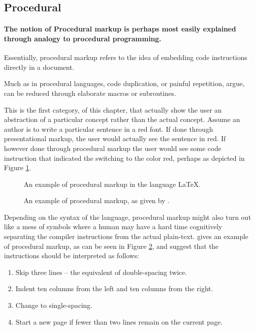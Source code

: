 \documentclass{scrreprt}
\begin{document}
\subsection{Procedural}
\paragraph{The notion of Procedural markup is perhaps most easily explained through analogy to procedural programming.} Essentially, procedural markup refers to the idea of embedding code instructions directly in a document.

Much as in procedural languages, code duplication, or painful repetition, \citet{bray} argue, can be reduced through elaborate macros or subroutines.

This is the first category, of this chapter, that actually show the user an abstraction of a particular concept rather than the actual concept. Assume an author is to write a particular sentence in a red font. If done through presentational markup, the user would actually see the sentence in red. If however done through procedural markup the user would see some code instruction that indicated the switching to the color red, perhaps as depicted in Figure \ref{fig:procedural-markup-red-sentence}.


\begin{figure}[h]
\centering
{}
\caption{An example of procedural markup in the language \LaTeX{}.}
\label{fig:procedural-markup-red-sentence}
\end{figure}


\begin{figure}[h]
\centering
{}
\caption{An example of procedural markup, as given by \citet{coombs}.}
\label{fig:procedural-markup-coombs}
\end{figure}



Depending on the syntax of the language, procedural markup might also turn out like a mess of symbols where a human may have a hard time cognitively separating the compiler instructions from the actual plain-text. \citet{coombs} gives an example of procedural markup, as can be seen in Figure \ref{fig:procedural-markup-coombs}, and suggest that the instructions should be interpreted as follows:

\begin{enumerate}
\item Skip three lines -- the equivalent of double-spacing twice.
\item Indent ten columns from the left and ten columns from the right.
\item Change to single-spacing.
\item Start a new page if fewer than two lines remain on the current page.
\end{enumerate}
\end{document}
